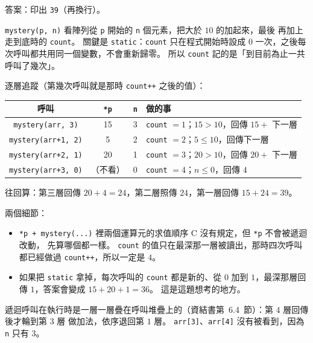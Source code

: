 \begin{pastsoln}
答案：印出 \texttt{39}（再換行）。

\texttt{mystery(p, n)} 看陣列從 \texttt{p} 開始的 \texttt{n} 個元素，把大於 $10$ 的加起來，最後
再加上走到底時的 \texttt{count}。 關鍵是 \texttt{static}：\texttt{count} 只在程式開始時設成 $0$
一次，之後每次呼叫都共用同一個變數，不會重新歸零。 所以 \texttt{count} 記的是「到目前為止一共
呼叫了幾次」。

逐層追蹤（第幾次呼叫就是那時 \texttt{count++} 之後的值）：
\begin{center}
\small
\begin{tabular}{cccl}
\toprule
呼叫 & \texttt{*p} & \texttt{n} & 做的事 \\
\midrule
\texttt{mystery(arr, 3)} & 15 & 3 & \texttt{count} $= 1$；$15 > 10$，回傳 $15 +$ 下一層 \\
\texttt{mystery(arr+1, 2)} & 5 & 2 & \texttt{count} $= 2$；$5 \le 10$，回傳下一層 \\
\texttt{mystery(arr+2, 1)} & 20 & 1 & \texttt{count} $= 3$；$20 > 10$，回傳 $20 +$ 下一層 \\
\texttt{mystery(arr+3, 0)} & （不看） & 0 & \texttt{count} $= 4$；$n \le 0$，回傳 $4$ \\
\bottomrule
\end{tabular}
\end{center}
往回算：第三層回傳 $20 + 4 = 24$，第二層照傳 $24$，第一層回傳 $15 + 24 = 39$。

兩個細節：
\begin{itemize}
\item \texttt{*p + mystery(...)} 裡兩個運算元的求值順序 C 沒有規定，但 \texttt{*p} 不會被遞迴改動，
先算哪個都一樣。 \texttt{count} 的值只在最深那一層被讀出，那時四次呼叫都已經做過
\texttt{count++}，所以一定是 $4$。
\item 如果把 \texttt{static} 拿掉，每次呼叫的 \texttt{count} 都是新的、從 $0$ 加到 $1$，最深那層回傳
$1$，答案會變成 $15 + 20 + 1 = 36$。 這是這題想考的地方。
\end{itemize}
遞迴呼叫在執行時是一層一層疊在呼叫堆疊上的（資結書第~6.4~節）：第 $4$ 層回傳後才輪到第 $3$ 層
做加法，依序退回第 $1$ 層。 \texttt{arr[3]}、\texttt{arr[4]} 沒有被看到，因為 \texttt{n} 只有 $3$。
\end{pastsoln}
